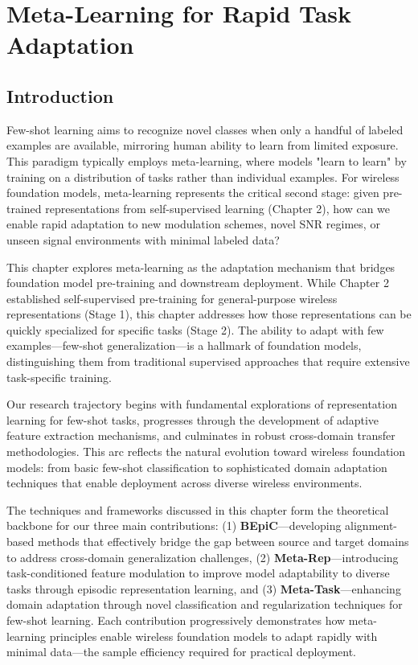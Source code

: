 \sloppy
\chapter{Meta-Learning for Rapid Task Adaptation}

\section{Introduction}

Few-shot learning aims to recognize novel classes when only a handful of labeled examples are available, mirroring human ability to learn from limited exposure. This paradigm typically employs meta-learning, where models "learn to learn" by training on a distribution of tasks rather than individual examples. For wireless foundation models, meta-learning represents the critical second stage: given pre-trained representations from self-supervised learning (Chapter 2), how can we enable rapid adaptation to new modulation schemes, novel SNR regimes, or unseen signal environments with minimal labeled data?

This chapter explores meta-learning as the adaptation mechanism that bridges foundation model pre-training and downstream deployment. While Chapter 2 established self-supervised pre-training for general-purpose wireless representations (Stage 1), this chapter addresses how those representations can be quickly specialized for specific tasks (Stage 2). The ability to adapt with few examples—few-shot generalization—is a hallmark of foundation models, distinguishing them from traditional supervised approaches that require extensive task-specific training.

Our research trajectory begins with fundamental explorations of representation learning for few-shot tasks, progresses through the development of adaptive feature extraction mechanisms, and culminates in robust cross-domain transfer methodologies. This arc reflects the natural evolution toward wireless foundation models: from basic few-shot classification to sophisticated domain adaptation techniques that enable deployment across diverse wireless environments.

The techniques and frameworks discussed in this chapter form the theoretical backbone for our three main contributions: (1) \textbf{BEpiC}—developing alignment-based methods that effectively bridge the gap between source and target domains to address cross-domain generalization challenges, (2) \textbf{Meta-Rep}—introducing task-conditioned feature modulation to improve model adaptability to diverse tasks through episodic representation learning, and (3) \textbf{Meta-Task}—enhancing domain adaptation through novel classification and regularization techniques for few-shot learning. Each contribution progressively demonstrates how meta-learning principles enable wireless foundation models to adapt rapidly with minimal data—the sample efficiency required for practical deployment.

